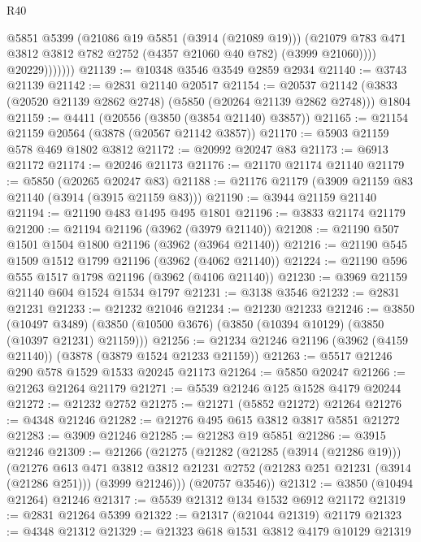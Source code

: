 \begin{lexlean}{R40}
\begin{coremodule}
                      @5851
                      @5399
                      (@21086 @19 @5851 (@3914 (@21089 @19)))
                      (@21079
                        @783
                        @471
                        @3812
                        @3812
                        @782
                        @2752
                        (@4357 @21060 @40 @782)
                        (@3999 @21060))))
                  @20229)))))))
@21139 := @10348 @3546 @3549 @2859 @2934
@21140 := @3743 @21139
@21142 := @2831 @21140 @20517
@21154 := @20537
    @21142
    (@3833 (@20520 @21139 @2862 @2748) (@5850 (@20264 @21139 @2862 @2748)))
    @1804
@21159 := @4411 (@20556 (@3850 (@3854 @21140) @3857))
@21165 := @21154 @21159 @20564 (@3878 (@20567 @21142 @3857))
@21170 := @5903 @21159 @578 @469 @1802 @3812
@21172 := @20992 @20247 @83
@21173 := @6913 @21172
@21174 := @20246 @21173
@21176 := @21170 @21174 @21140
@21179 := @5850 (@20265 @20247 @83)
@21188 := @21176 @21179 (@3909 @21159 @83 @21140 (@3914 (@3915 @21159 @83)))
@21190 := @3944 @21159 @21140
@21194 := @21190 @483 @1495 @495 @1801
@21196 := @3833 @21174 @21179
@21200 := @21194 @21196 (@3962 (@3979 @21140))
@21208 := @21190 @507 @1501 @1504 @1800 @21196 (@3962 (@3964 @21140))
@21216 := @21190 @545 @1509 @1512 @1799 @21196 (@3962 (@4062 @21140))
@21224 := @21190 @596 @555 @1517 @1798 @21196 (@3962 (@4106 @21140))
@21230 := @3969 @21159 @21140 @604 @1524 @1534 @1797
@21231 := @3138 @3546
@21232 := @2831 @21231
@21233 := @21232 @21046
@21234 := @21230 @21233
@21246 := @3850
    (@10497 @3489)
    (@3850 (@10500 @3676) (@3850 (@10394 @10129) (@3850 (@10397 @21231) @21159)))
@21256 := @21234 @21246 @21196 (@3962 (@4159 @21140)) (@3878 (@3879 @1524 @21233 @21159))
@21263 := @5517 @21246 @290 @578 @1529 @1533 @20245 @21173
@21264 := @5850 @20247
@21266 := @21263 @21264 @21179
@21271 := @5539 @21246 @125 @1528 @4179 @20244
@21272 := @21232 @2752
@21275 := @21271 (@5852 @21272) @21264
@21276 := @4348 @21246
@21282 := @21276 @495 @615 @3812 @3817 @5851 @21272
@21283 := @3909 @21246
@21285 := @21283 @19 @5851
@21286 := @3915 @21246
@21309 := @21266
    (@21275
      (@21282
        (@21285 (@3914 (@21286 @19)))
        (@21276
          @613
          @471
          @3812
          @3812
          @21231
          @2752
          (@21283 @251 @21231 (@3914 (@21286 @251)))
          (@3999 @21246)))
      (@20757 @3546))
@21312 := @3850 (@10494 @21264) @21246
@21317 := @5539 @21312 @134 @1532 @6912 @21172
@21319 := @2831 @21264 @5399
@21322 := @21317 (@21044 @21319) @21179
@21323 := @4348 @21312
@21329 := @21323 @618 @1531 @3812 @4179 @10129 @21319

\end{coremodule}
\end{lexlean}
